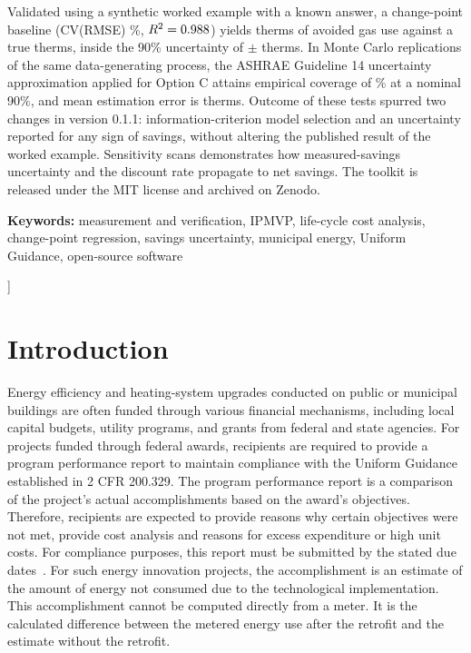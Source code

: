 \documentclass[10pt,twocolumn,letterpaper]{article}
\begin{document}
\begin{@twocolumnfalse}
\begin{center}
\begin{minipage}{0.86\textwidth}
Validated using a synthetic worked example with a known answer, a \ModelForm{} change-point baseline (CV(RMSE) \CvRmse\%, $R^2=0.988$) yields \AvoidedTherms{} therms of avoided gas use against a true \TrueAvoided{} therms, inside the 90\% uncertainty of $\pm$\AbsUnc{} therms. In \McReps{} Monte Carlo replications of the same data-generating process, the ASHRAE Guideline 14 uncertainty approximation applied for Option C attains empirical coverage of \McCovNinety\% at a nominal 90\%, and mean estimation error is \McMeanErr{} therms. Outcome of these tests spurred two changes in version 0.1.1: information-criterion model selection and an uncertainty reported for any sign of savings, without altering the published result of the worked example. Sensitivity scans demonstrates how measured-savings uncertainty and the discount rate propagate to net savings. The toolkit is released under the MIT license and archived on Zenodo.\par\vspace{0.4em}
\textbf{Keywords:} measurement and verification, IPMVP, life-cycle cost analysis, change-point regression, savings uncertainty, municipal energy, Uniform Guidance, open-source software
\end{minipage}
\end{center}
\vspace{1.2em}
\end{@twocolumnfalse}
]

\section{Introduction}

Energy efficiency and heating-system upgrades conducted on public or municipal buildings are often funded through various financial mechanisms, including local capital budgets, utility programs, and grants from federal and state agencies. For projects funded through federal awards, recipients are required to provide a program performance report to maintain compliance with the Uniform Guidance established in 2 CFR 200.329. The program performance report is a comparison of the project's actual accomplishments based on the award's objectives. Therefore, recipients are expected to provide reasons why certain objectives were not met, provide cost analysis and reasons for excess expenditure or high unit costs. For compliance purposes, this report must be submitted by the stated due dates~\cite{cfr200329}. For such energy innovation projects, the accomplishment is an estimate of the amount of energy not consumed due to the technological implementation. This accomplishment cannot be computed directly from a meter. It is the calculated difference between the metered energy use after the retrofit and the estimate without the retrofit.
\end{document}
